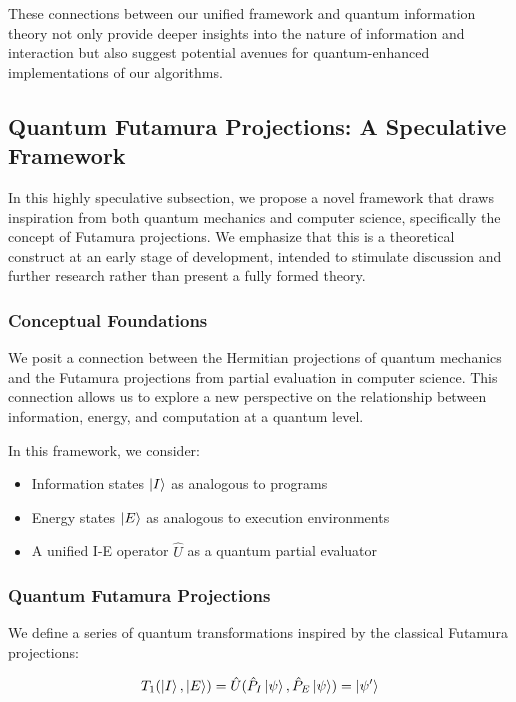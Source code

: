 These connections between our unified framework and quantum information theory not only provide deeper insights into the nature of information and interaction but also suggest potential avenues for quantum-enhanced implementations of our algorithms.

\subsection{Quantum Futamura Projections: A Speculative Framework}

In this highly speculative subsection, we propose a novel framework that draws inspiration from both quantum mechanics and computer science, specifically the concept of Futamura projections. We emphasize that this is a theoretical construct at an early stage of development, intended to stimulate discussion and further research rather than present a fully formed theory.

\subsubsection{Conceptual Foundations}

We posit a connection between the Hermitian projections of quantum mechanics and the Futamura projections from partial evaluation in computer science. This connection allows us to explore a new perspective on the relationship between information, energy, and computation at a quantum level.

In this framework, we consider:

\begin{itemize}
    \item Information states $\ket{I}$ as analogous to programs
    \item Energy states $\ket{E}$ as analogous to execution environments
    \item A unified I-E operator $\hat{U}$ as a quantum partial evaluator
\end{itemize}

\subsubsection{Quantum Futamura Projections}

We define a series of quantum transformations inspired by the classical Futamura projections:

\begin{equation}
    T_1(\ket{I}, \ket{E}) = \hat{U}(\hat{P}_I\ket{\psi}, \hat{P}_E\ket{\psi}) = \ket{\psi'}
\end{equation}

